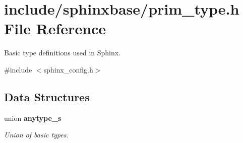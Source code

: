 \section{include/sphinxbase/prim\-\_\-type.h \-File \-Reference}
\label{prim__type_8h}


\-Basic type definitions used in \-Sphinx.  


{\ttfamily \#include $<$sphinx\-\_\-config.\-h$>$}\*
\subsection*{\-Data \-Structures}
\begin{DoxyCompactItemize}
\item 
union {\bf anytype\-\_\-s}
\begin{DoxyCompactList}\small\item\em \-Union of basic types. \end{DoxyCompactList}\end{DoxyCompactItemize}
